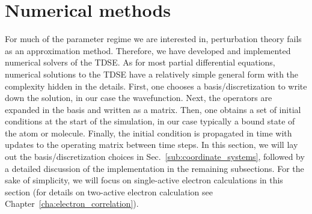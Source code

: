
\section{Numerical methods} %
\label{sec:numerical_methods}
For much of the parameter regime we are interested in, perturbation theory fails as an approxi\-mation method. Therefore, we have developed and implemented numerical solvers of the TDSE. As for most partial differential equations, numerical solutions to the TDSE have a relatively simple general form with the complexity hidden in the details. First, one chooses a basis/discretization to write down the solution, in our case the wavefunction. Next, the operators are expanded in the basis and written as a matrix. Then, one obtains a set of initial conditions at the start of the simulation, in our case typically a bound state of the atom or molecule. Finally, the initial condition is propagated in time with updates to the operating matrix between time steps. In this section, we will lay out the basis/discretization choices in Sec.~\ref{sub:coordinate_systems}, followed by a detailed discussion of the implementation in the remaining subsections. For the sake of simplicity, we will focus on single-active electron calculations in this section (for details on two-active electron calculation see Chapter~\ref{cha:electron_correlation}).



